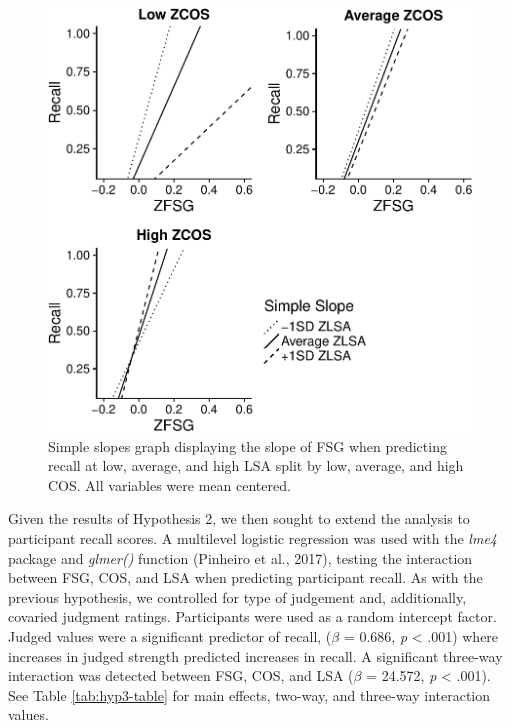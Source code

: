\documentclass[english,man]{apa6}
\theoremstyle{definition}
\theoremstyle{definition}
\theoremstyle{definition}
\theoremstyle{remark}
\begin{document}
\begin{figure}
\centering
\includegraphics{max_buch_JOL_files/figure-latex/hyp3graph-1.pdf}
\caption{\label{fig:hyp3graph}Simple slopes graph displaying the slope of
FSG when predicting recall at low, average, and high LSA split by low,
average, and high COS. All variables were mean centered.}
\end{figure}

Given the results of Hypothesis 2, we then sought to extend the analysis
to participant recall scores. A multilevel logistic regression was used
with the \emph{lme4} package and \emph{glmer()} function (Pinheiro et
al., 2017), testing the interaction between FSG, COS, and LSA when
predicting participant recall. As with the previous hypothesis, we
controlled for type of judgement and, additionally, covaried judgment
ratings. Participants were used as a random intercept factor. Judged
values were a significant predictor of recall, (\(\beta\) = 0.686,
\emph{p} \textless{} .001) where increases in judged strength predicted
increases in recall. A significant three-way interaction was detected
between FSG, COS, and LSA (\(\beta\) = 24.572, \emph{p} \textless{}
.001). See Table \ref{tab:hyp3-table} for main effects, two-way, and
three-way interaction values.
\end{document}
